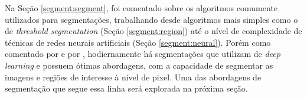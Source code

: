 Na Seção \ref{segment:segment}, foi comentado sobre os algoritmos comumente utilizados para segmentações, trabalhando desde algoritmos mais simples como o de \textit{threshold segmentation} (Seção \ref{segment:region}) até o nível de complexidade de técnicas de redes neurais artificiais (Seção \ref{segment:neural}). Porém como comentado por \cite{Ghosh2019} e por \cite{Minaee2021}, hodiernamente há segmentações que utilizam de \textit{deep learning} e possuem ótimas abordagens, com a capacidade de segmentar as imagens e regiões de interesse à nível de pixel. Uma das abordagens de segmentação que segue essa linha será explorada na próxima seção.